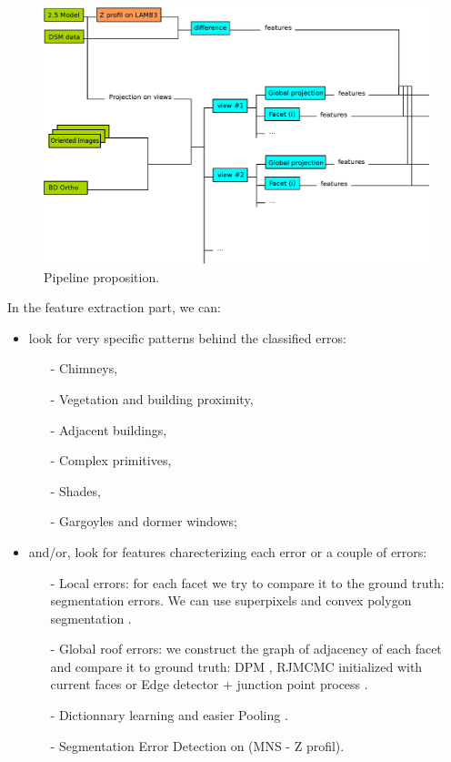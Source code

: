 \documentclass[a4paper, 11pt]{article}
\begin{document}
	\begin{figure}[H]
		\begin{center}
			\includegraphics[scale=.5]{images/vectorial/pipeline.eps}
			\caption{Pipeline proposition.}
			\label{fig::pipeline}
		\end{center}
	\end{figure}
	
	In the feature extraction part, we can:
	\begin{itemize}
		\item look for very specific patterns behind the classified erros:
			\begin{itemize}
				\item[-] Chimneys,
				\item[-] Vegetation and building proximity,
				\item[-] Adjacent buildings,
				\item[-] Complex primitives,
				\item[-] Shades,
				\item[-] Gargoyles and dormer windows;
			\end{itemize}
		\item and/or, look for features charecterizing each error or a couple of errors:
			\begin{itemize}
				\item[-] Local errors: for each facet we try to compare it to the ground truth: segmentation errors. We can use superpixels \cite{Achanta:2012:SSC:2377349.2377556} and convex polygon segmentation \cite{duan2015image}.
				\item[-] Global roof errors: we construct the graph of adjacency of each facet and compare it to ground truth: DPM \cite{felzenszwalb2010object}, RJMCMC initialized with current faces or Edge detector + junction point process \cite{chai2013recovering}.
				\item[-] Dictionnary learning and easier Pooling \cite{bach2010sparse}.
				\item[-] Segmentation Error Detection on (MNS - Z profil).
			\end{itemize}
	\end{itemize}
	
\end{document}
